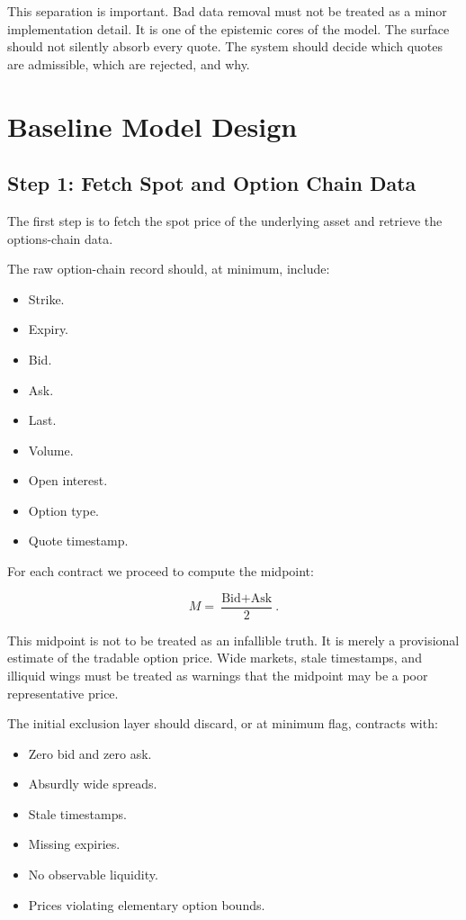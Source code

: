 \documentclass[11pt]{article}
\begin{document}
This separation is important. Bad data removal must not be treated as a minor implementation detail. It is one of the epistemic cores of the model. The surface should not silently absorb every quote. The system should decide which quotes are admissible, which are rejected, and why.

\section{Baseline Model Design}

\subsection{Step 1: Fetch Spot and Option Chain Data}

The first step is to fetch the spot price of the underlying asset and retrieve the options-chain data.

The raw option-chain record should, at minimum, include:

\begin{itemize}[leftmargin=1.5em]
    \item Strike.
    \item Expiry.
    \item Bid.
    \item Ask.
    \item Last.
    \item Volume.
    \item Open interest.
    \item Option type.
    \item Quote timestamp.
\end{itemize}

For each contract we proceed to compute the midpoint:

\[
M = \frac{\text{Bid}+\text{Ask}}{2}.
\]

This midpoint is not to be treated as an infallible truth. It is merely a provisional estimate of the tradable option price. Wide markets, stale timestamps, and illiquid wings must be treated as warnings that the midpoint may be a poor representative price.

The initial exclusion layer should discard, or at minimum flag, contracts with:

\begin{itemize}[leftmargin=1.5em]
    \item Zero bid and zero ask.
    \item Absurdly wide spreads.
    \item Stale timestamps.
    \item Missing expiries.
    \item No observable liquidity.
    \item Prices violating elementary option bounds.
\end{itemize}
\end{document}
